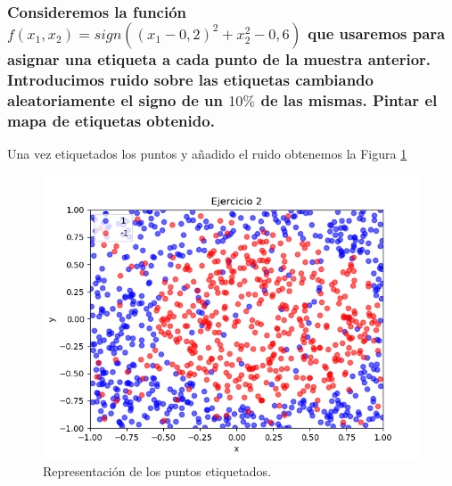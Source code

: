 \documentclass[12pt,a4paper]{article}
\begin{document}
\subsubsection{Consideremos la función $f(x_1,x_2) = sign((x_1-0,2)^2 + x^{2}_2 - 0,6)$ que usaremos para asignar una etiqueta a cada punto de la muestra anterior. Introducimos 	ruido sobre las etiquetas cambiando aleatoriamente el signo de un $10\%$ de las mismas. Pintar el mapa de etiquetas obtenido.}
Una vez etiquetados los puntos y añadido el ruido obtenemos la Figura \ref{pic:ruido}
\begin{figure}[H]  %
	
	\centering
	\includegraphics[width=0.7\textheight]{images/puntosConRuido.png}  %
	\caption{Representación de los puntos etiquetados.}
	\label{pic:ruido}
\end{figure}
\end{document}
